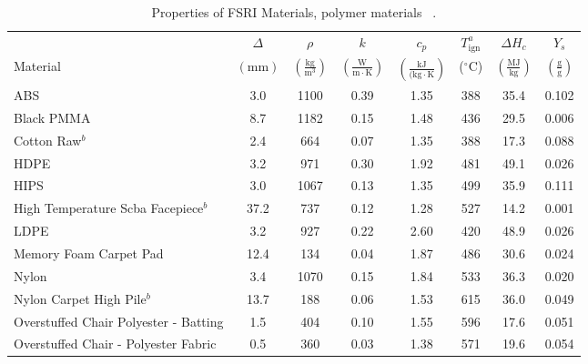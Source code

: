 \begin{table}[!h]
\caption[Properties of FSRI Materials, polymer materials]{Properties of FSRI Materials, polymer materials ~\cite{McKinnon:FSRI2023_Data}.}
\centering
\begin{tabular}{|p{6.5cm}|c|c|c|c|c|c|c|}
\hline
            & \centering$\Delta$& \centering$\rho$& \centering$k$& \centering$c_{p}$ &\centering$T_{\mathrm{ign}}^{a}$&\centering$\Delta H_{c}$& $Y_{s}$ \\
Material    & \centering$\mathrm{\left(mm\right)}$ & \centering$\mathrm{\left(\frac{kg}{m^{3}}\right)}$ & \centering$\mathrm{\left(\frac{W}{m\cdot K}\right)}$ & \centering$\mathrm{\left(\frac{kJ}{(kg\cdot K}\right)}$ & \centering($\mathrm{^{\circ}C}$)   & \centering$\left(\mathrm{\frac{MJ}{kg}}\right)$ & $\mathrm{\left(\frac{g}{g}\right)}$ \\ \hline
\hline
ABS                                               & 3.0  & 1100 & 0.39 & 1.35 & 388 & 35.4 & 0.102 \\\hline
Black PMMA                                        & 8.7  & 1182 & 0.15 & 1.48 & 436 & 29.5 & 0.006 \\\hline
Cotton Raw$^{b}$                                  & 2.4  & 664  & 0.07 & 1.35 & 388 & 17.3 & 0.088 \\\hline
HDPE                                              & 3.2  & 971  & 0.30 & 1.92 & 481 & 49.1 & 0.026 \\\hline
HIPS                                              & 3.0  & 1067 & 0.13 & 1.35 & 499 & 35.9 & 0.111 \\\hline
High Temperature Scba Facepiece$^{b}$             & 37.2 & 737  & 0.12 & 1.28 & 527 & 14.2 & 0.001 \\\hline
LDPE                                              & 3.2  & 927  & 0.22 & 2.60 & 420 & 48.9 & 0.026 \\\hline
Memory Foam Carpet Pad                            & 12.4 & 134  & 0.04 & 1.87 & 486 & 30.6 & 0.024 \\\hline
Nylon                                             & 3.4  & 1070 & 0.15 & 1.84 & 533 & 36.3 & 0.020 \\\hline
Nylon Carpet High Pile$^{b}$                      & 13.7 & 188  & 0.06 & 1.53 & 615 & 36.0 & 0.049 \\\hline
Overstuffed Chair Polyester - Batting             & 1.5  & 404  & 0.10 & 1.55 & 596 & 17.6 & 0.051 \\\hline
Overstuffed Chair - Polyester Fabric              & 0.5  & 360  & 0.03 & 1.38 & 571 & 19.6 & 0.054 \\\hline

\end{tabular}
\end{table}
